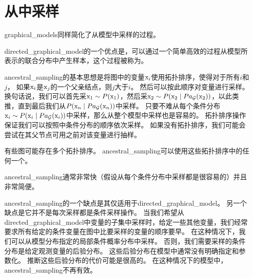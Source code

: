 \section{从中采样}
\label{sec:sampling_from_graphical_models}

\gls{graphical_models}同样简化了从模型中采样的过程。


\gls{directed_graphical_model}的一个优点是，可以通过一个简单高效的过程从模型所表示的联合分布中产生样本，这个过程被称为。


\gls{ancestral_sampling}的基本思想是将图中的变量$\mathrm{x}_i$使用拓扑排序，使得对于所有$i$和$j$，
如果$\mathrm{x}_i$是$\mathrm{x}_j$的一个父亲结点，则$j$大于$i$。
然后可以按此顺序对变量进行采样。
换句话说，我们可以首先采$\mathrm{x}_1\sim P(\mathrm{x}_1)$，然后采$\mathrm{x}_2\sim P(\mathrm{x}_2\mid Pa_{\mathcal{G}}(\mathrm{x}_2))$，以此类推，直到最后我们从$ P(\mathrm{x}_n\mid Pa_{\mathcal{G}}(\mathrm{x}_n))$中采样。
只要不难从每个条件分布$\mathrm{x}_i\sim P(\mathrm{x}_i\mid Pa_{\mathcal{G}}(\mathrm{x}_i))$中采样，那么从整个模型中采样也是容易的。
拓扑排序操作保证我们可以按照中条件分布的顺序依次采样。
如果没有拓扑排序，我们可能会尝试在其父节点可用之前对该变量进行抽样。


有些图可能存在多个拓扑排序。 
\gls{ancestral_sampling}可以使用这些拓扑排序中的任何一个。

\gls{ancestral_sampling}通常非常快（假设从每个条件分布中采样都是很容易的）并且非常简便。


\gls{ancestral_sampling}的一个缺点是其仅适用于\gls{directed_graphical_model}。 
另一个缺点是它并不是每次采样都是条件采样操作。%
当我们希望从\gls{directed_graphical_model}中变量的子集中采样时，给定一些其他变量，我们经常要求所有给定的条件变量在图中比要采样的变量的顺序要早。
在这种情况下，我们可以从模型分布指定的局部条件概率分布中采样。 
否则，我们需要采样的条件分布是给定观测变量的后验分布。
这些后验分布在模型中通常没有明确指定和参数化。 
推断这些后验分布的代价可能是很高的。 
在这种情况下的模型中，\gls{ancestral_sampling}不再有效。




